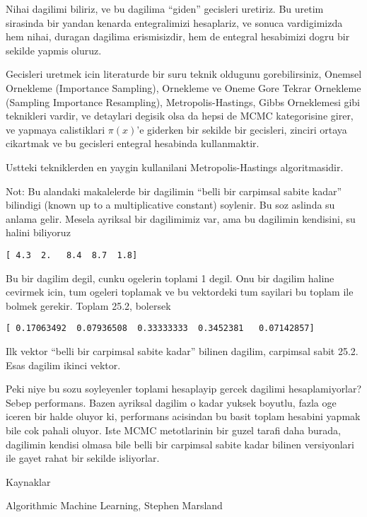 \documentclass[12pt,fleqn]{article}
\begin{document}
Nihai dagilimi biliriz, ve bu dagilima ``giden'' gecisleri uretiriz. Bu
uretim sirasinda bir yandan kenarda entegralimizi hesaplariz, ve sonuca
vardigimizda hem nihai, duragan dagilima erismisizdir, hem de entegral
hesabimizi dogru bir sekilde yapmis oluruz. 

Gecisleri uretmek icin literaturde bir suru teknik oldugunu gorebilirsiniz,
Onemsel Ornekleme (Importance Sampling), Ornekleme ve Oneme Gore Tekrar
Ornekleme (Sampling Importance Resampling), Metropolis-Hastings, Gibbs
Orneklemesi gibi teknikleri vardir, ve detaylari degisik olsa da hepsi de
MCMC kategorisine girer, ve yapmaya calistiklari $\pi(x)$'e giderken bir
sekilde bir gecisleri, zinciri ortaya cikartmak ve bu gecisleri entegral
hesabinda kullanmaktir.

Ustteki tekniklerden en yaygin kullanilani Metropolis-Hastings
algoritmasidir. 

Not: Bu alandaki makalelerde bir dagilimin ``belli bir carpimsal sabite
kadar'' bilindigi (known up to a multiplicative constant) soylenir. Bu soz
aslinda su anlama gelir. Mesela ayriksal bir dagilimimiz var, ama bu
dagilimin kendisini, su halini biliyoruz

\verb![ 4.3  2.   8.4  8.7  1.8]!

Bu bir dagilim degil, cunku ogelerin toplami 1 degil. Onu bir dagilim
haline cevirmek icin, tum ogeleri toplamak ve bu vektordeki tum sayilari bu
toplam ile bolmek gerekir. Toplam 25.2, bolersek

\verb![ 0.17063492  0.07936508  0.33333333  0.3452381   0.07142857]!

Ilk vektor ``belli bir carpimsal sabite kadar'' bilinen dagilim, carpimsal
sabit 25.2. Esas dagilim ikinci vektor. 

Peki niye bu sozu soyleyenler toplami hesaplayip gercek dagilimi
hesaplamiyorlar? Sebep performans. Bazen ayriksal dagilim o kadar yuksek
boyutlu, fazla oge iceren bir halde oluyor ki, performans acisindan bu
basit toplam hesabini yapmak bile cok pahali oluyor. Iste MCMC metotlarinin
bir guzel tarafi daha burada, dagilimin kendisi olmasa bile belli bir
carpimsal sabite kadar bilinen versiyonlari ile gayet rahat bir sekilde
isliyorlar.

Kaynaklar

Algorithmic Machine Learning, Stephen Marsland
\end{document}
